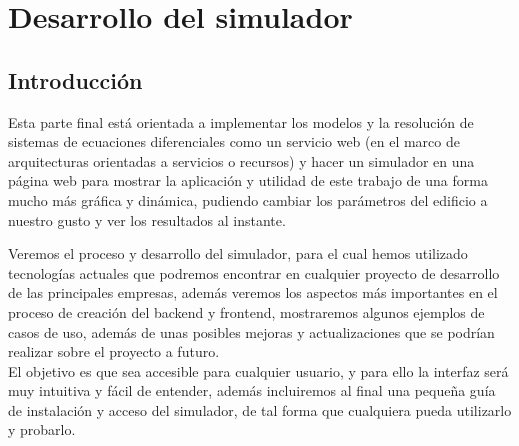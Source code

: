 \chapter{Desarrollo del simulador}
\section{Introducción}
Esta parte final está orientada a implementar los modelos y la resolución de sistemas de ecuaciones diferenciales como un servicio web (en el marco de arquitecturas orientadas a servicios o recursos) y hacer un simulador en una página web para mostrar la aplicación y utilidad de este trabajo de una forma mucho más gráfica y dinámica, pudiendo cambiar los parámetros del edificio a nuestro gusto y ver los resultados al instante.

Veremos el proceso y desarrollo del simulador, para el cual hemos utilizado tecnologías actuales que podremos encontrar en cualquier proyecto de desarrollo de las principales empresas, además veremos los aspectos más importantes en el proceso de creación del backend y frontend, mostraremos algunos ejemplos de casos de uso, además de unas posibles mejoras y actualizaciones que se podrían realizar sobre el proyecto a futuro.\\

El objetivo es que sea accesible para cualquier usuario, y para ello la interfaz será muy intuitiva y fácil de entender, además incluiremos al final una pequeña guía de instalación y acceso del simulador, de tal forma que cualquiera pueda utilizarlo y probarlo.
